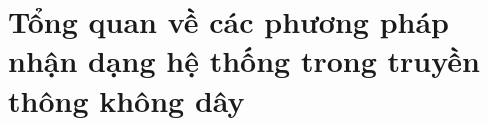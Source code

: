 \clearpage
{}

\setcounter{chapter}{0}
\chapter[TỔNG QUAN VỀ CÁC PHƯƠNG PHÁP NHẬN DẠNG HỆ THỐNG TRONG TRUYỀN THÔNG KHÔNG DÂY]{Tổng quan về các phương pháp nhận dạng hệ thống trong truyền thông không dây}

~\cite{abed1997}

~\cite{Garro2020}

~\cite{bertsekas2014constrained}

~\cite{GesbertSPAWC}